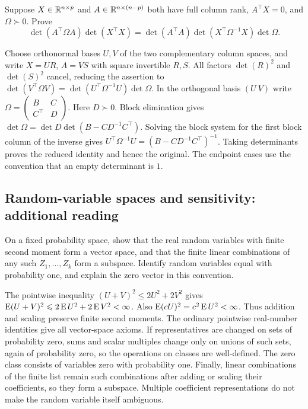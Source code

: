 \begin{problem}
Suppose $X\in\mathbb R^{n\times p}$ and $A\in\mathbb R^{n\times(n-p)}$ both have
full column rank, $A^\top X=0$, and $\Omega\succ0$. Prove
\[
\det(A^\top\Omega A)\det(X^\top X)
=\det(A^\top A)\det(X^\top\Omega^{-1}X)\det\Omega.
\]
\end{problem}
\begin{solution}
Choose orthonormal bases $U,V$ of the two complementary column spaces,
and write $X=UR$, $A=VS$ with square invertible $R,S$.
All factors $\det(R)^2$ and $\det(S)^2$ cancel, reducing the assertion to
$\det(V^\top\Omega V)=\det(U^\top\Omega^{-1}U)\det\Omega$.
In the orthogonal basis $(U\ V)$ write
$\Omega=\begin{pmatrix}B&C\\C^\top&D\end{pmatrix}$.
Here $D\succ0$. Block elimination gives
$\det\Omega=\det D\det(B-CD^{-1}C^\top)$.
Solving the block system for the first block column of the inverse gives
$U^\top\Omega^{-1}U=(B-CD^{-1}C^\top)^{-1}$.
Taking determinants proves the reduced identity and hence the original.
The endpoint cases use the convention that an empty determinant is $1$.
\end{solution}

\subsection*{Random-variable spaces and sensitivity: additional reading}
\begin{problem}
On a fixed probability space, show that the real random variables with
finite second moment form a vector space, and that the finite linear
combinations of any such $Z_1,\ldots,Z_k$ form a subspace.
Identify random variables equal with probability one, and explain the
zero vector in this convention.
\end{problem}
\begin{solution}
The pointwise inequality $(U+V)^2\leqslant2U^2+2V^2$ gives
$\operatorname{E}(U+V)^2\leqslant2\operatorname{E} U^2+2\operatorname{E} V^2<\infty$.
Also $\operatorname{E}(cU)^2=c^2\operatorname{E} U^2<\infty$. Thus addition and scaling preserve
finite second moments. The ordinary pointwise real-number identities
give all vector-space axioms. If representatives are changed on sets
of probability zero, sums and scalar multiples change only on unions
of such sets, again of probability zero, so the operations on classes
are well-defined. The zero class consists of variables zero with
probability one. Finally, linear combinations of the finite list remain
such combinations after adding or scaling their coefficients, so they
form a subspace. Multiple coefficient representations do not make the
random variable itself ambiguous.
\end{solution}

